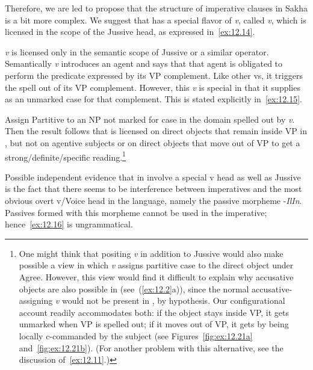 \documentclass[output=paper]{langsci/langscibook}
\begin{document}
Therefore, we are led to propose that the structure of imperative clauses in
Sakha is a bit more complex. We suggest that  has a special flavor
of \emph{v}, called \emph{v}\textsubscript{\Imp}, which is licensed in the scope of
the Jussive head, as expressed in~\eqref{ex:12.14}.

\ea\label{ex:12.14}
\emph{v}\textsubscript{\Imp} is licensed only in the semantic scope of Jussive or a similar operator.
\z
Semantically \emph{v}\textsubscript{\Imp} introduces an agent and says that that agent
is obligated to perform the predicate expressed by its VP complement. Like
other vs, it triggers the spell out of its VP complement. However, this \emph{v} is
special in that it supplies  as an unmarked case for that
complement. This is stated explicitly in~\eqref{ex:12.15}.

\ea\label{ex:12.15}
Assign Partitive to an NP not marked for case in the domain spelled out by \emph{v}\textsubscript{\Imp}.
\z
Then the result follows that  is licensed on direct objects
that remain inside VP in , but not on agentive subjects or on direct
objects that move out of VP to get a strong/definite/specific
reading.\footnote{One might think that positing \emph{v}\textsubscript{\Imp} in
    addition to Jussive would also make possible a view in which
    \emph{v}\textsubscript{\Imp} assigns partitive case to the direct object
    under Agree.  However, this view would find it difficult to explain why
    accusative objects are also possible in 
    (see~(\ref{ex:12.2}a)), since the normal accusative-assigning \emph{v}
    would not be present in , by hypothesis. Our
    configurational account readily accommodates both: if the object stays
    inside VP, it gets unmarked  when VP is spelled out; if
    it moves out of VP, it gets  by being locally c-commanded by
    the subject (see Figures~\ref{fig:ex:12.21a} and~\ref{fig:ex:12.21b}). (For another problem with this
alternative, see the discussion of~\eqref{ex:12.11}.)}

Possible independent evidence that  in  involve a
special v head as well as Jussive is the fact that there seems to be
interference between imperatives and the most obvious overt v/Voice head in the
language, namely the passive morpheme -\emph{IlIn}. Passives formed with this
morpheme cannot be used in the imperative;
hence~\eqref{ex:12.16} is ungrammatical.
\end{document}
